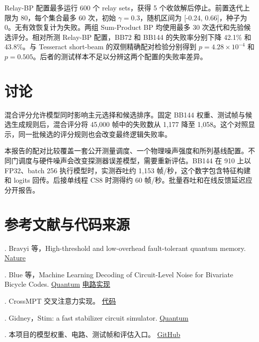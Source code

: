 \documentclass[UTF8,a4paper,zihao=-4,fontset=fandol]{ctexart}
\begin{document}
Relay-BP 配置最多运行 600 个 relay sets，获得 5 个收敛解后停止。前置迭代上限为 80，每个集合最多 60 次，初始 \(\gamma=0.3\)，随机区间为 [-0.24, 0.66]，种子为 0。无有效恢复计为失败。两组 Sum-Product BP 均使用最多 30 次迭代和先验候选评分。相对所测 Relay-BP 配置，BB72 和 BB144 的失败率分别下降 42.1\% 和 43.8\%。与 Tesseract short-beam 的双侧精确配对检验分别得到 \(p=4.28\times10^{-4}\) 和 \(p=0.505\)。后者的测试样本不足以分辨这两个配置的失败率差异。


\FloatBarrier\section{讨论}

混合评分允许模型同时影响主元选择和候选排序。固定 BB144 权重、测试帧与候选生成规则后，混合评分将 45,000 帧中的失败数从 1,177 降至 1,058。这个对照显示，同一批候选的评分规则也会改变最终逻辑失败率。


本报告的配对比较覆盖一套公开测量调度、一个物理噪声强度和所列基线配置。不同门调度与硬件噪声会改变探测器误差模型，需要重新评估。BB144 在 910 上以 FP32、batch 256 执行模型时，实测吞吐约 1,153 帧/秒，这个数字包含特征构建和 logits 回传。后接单线程 CS8 时测得约 60 帧/秒。批量吞吐和在线反馈延迟应分开报告。


\FloatBarrier\section*{参考文献与代码来源}

. Bravyi 等，High-threshold and low-overhead fault-tolerant quantum memory. \href{https://www.nature.com/articles/s41586-024-07107-7}{Nature}\par\smallskip

. Blue 等，Machine Learning Decoding of Circuit-Level Noise for Bivariate Bicycle Codes. \href{https://quantum-journal.org/papers/q-2026-06-30-2149/}{Quantum} \href{https://github.com/jblue1/ml_bb_decoding}{电路实现}\par\smallskip

. CrossMPT 交叉注意力实现。 \href{https://github.com/iil-postech/crossmpt}{代码}\par\smallskip

. Gidney，Stim: a fast stabilizer circuit simulator. \href{https://quantum-journal.org/papers/q-2021-07-06-497/}{Quantum}\par\smallskip

. 本项目的模型权重、电路、测试帧和评估入口。 \href{https://github.com/user97845678641456/recurrent-mpt-qec}{GitHub}\par\smallskip
\end{document}
